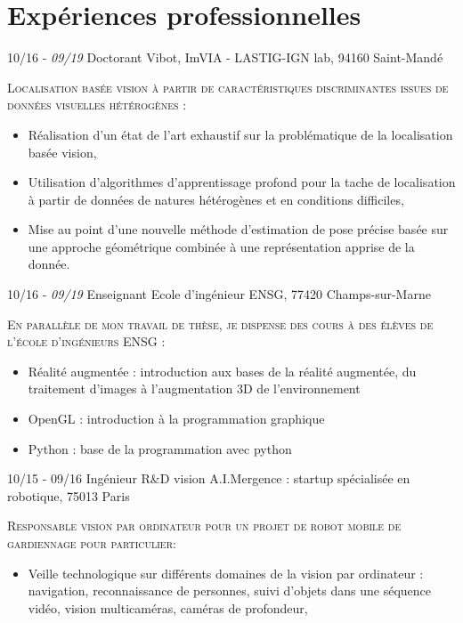 \documentclass[]{friggeri-cv-cust}
\begin{document}
\section{Expériences professionnelles}
\begin{entrylist}
  \entry
    {\small{10/16 - \textit{09/19}}}
    {Doctorant}
    {Vibot, ImVIA - LASTIG-IGN lab, 94160 Saint-Mandé}
    {\textsc{Localisation basée vision à partir de caractéristiques discriminantes issues de données visuelles hétérogènes :}
    \begin{itemize}[label=$\rhd$]
    	\item Réalisation d'un état de l'art exhaustif sur la problématique de la localisation basée vision,
        \item Utilisation d’algorithmes d'apprentissage profond pour la tache de localisation à partir de données de natures hétérogènes et en conditions difficiles,
        \item Mise au point d'une nouvelle méthode d'estimation de pose précise basée sur une approche géométrique combinée à une représentation apprise de la donnée.
    \end{itemize}
    }
  \entry
    {\small{10/16 - \textit{09/19}}}
    {Enseignant}
    {Ecole d'ingénieur ENSG, 77420 Champs-sur-Marne}
    {\textsc{En parallèle de mon travail de thèse, je dispense des cours à des élèves de l'école d’ingénieurs ENSG :}
    \begin{itemize}[label=$\rhd$]
        \item Réalité augmentée : introduction aux bases de la réalité augmentée, du traitement d'images à l'augmentation 3D de l'environnement
        \item OpenGL : introduction à la programmation graphique
   		\item Python : base de la programmation avec python
    \end{itemize}
    }
  \entry
    {10/15 - 09/16}
    {Ingénieur R\&D vision}
    {A.I.Mergence : startup spécialisée en robotique, 75013 Paris}
    {\textsc{Responsable vision par ordinateur pour un projet de robot mobile de gardiennage pour particulier:}
    \begin{itemize}[label=$\rhd$]
    	\item Veille technologique sur différents domaines de la vision par ordinateur : navigation, reconnaissance de personnes, suivi d'objets dans une séquence vidéo, vision multicaméras, caméras de profondeur,

\end{itemize}}
\end{entrylist}
\end{document}
